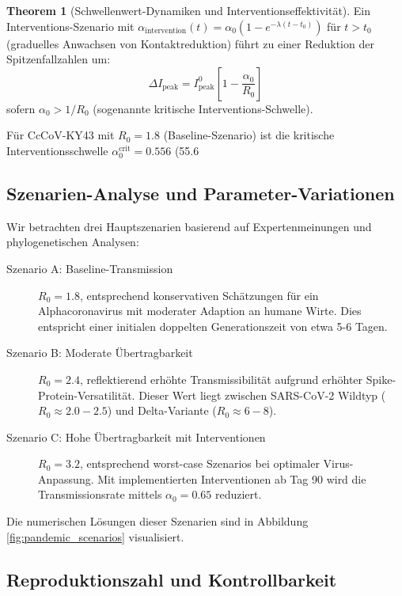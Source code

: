 \documentclass[11pt,a4paper]{article}
\theoremstyle{definition}
\newtheorem{theorem}{Theorem}[section]
\begin{document}
\begin{theorem}[Schwellenwert-Dynamiken und Interventionseffektivität]
\label{thm:intervention_threshold}
Ein Interventions-Szenario mit $\alpha_{\text{intervention}}(t) = \alpha_0 (1 - e^{-\lambda(t - t_0)})$ für $t > t_0$ (graduelles Anwachsen von Kontaktreduktion) führt zu einer Reduktion der Spitzenfallzahlen um:
\[
\Delta I_{\text{peak}} = I_{\text{peak}}^{0} \left[1 - \frac{\alpha_0}{R_0}\right]
\]
sofern $\alpha_0 > 1/R_0$ (sogenannte kritische Interventions-Schwelle).

Für CcCoV-KY43 mit $R_0 = 1.8$ (Baseline-Szenario) ist die kritische Interventionsschwelle $\alpha_0^{\text{crit}} = 0.556$ (55.6%
\end{theorem}

\subsection{Szenarien-Analyse und Parameter-Variationen}

Wir betrachten drei Hauptszenarien basierend auf Expertenmeinungen und phylogenetischen Analysen:

\begin{description}
\item[Szenario A: Baseline-Transmission] $R_0 = 1.8$, entsprechend konservativen Schätzungen für ein Alphacoronavirus mit moderater Adaption an humane Wirte. Dies entspricht einer initialen doppelten Generationszeit von etwa 5-6 Tagen.

\item[Szenario B: Moderate Übertragbarkeit] $R_0 = 2.4$, reflektierend erhöhte Transmissibilität aufgrund erhöhter Spike-Protein-Versatilität. Dieser Wert liegt zwischen SARS-CoV-2 Wildtyp ($R_0 \approx 2.0-2.5$) und Delta-Variante ($R_0 \approx 6-8$).

\item[Szenario C: Hohe Übertragbarkeit mit Interventionen] $R_0 = 3.2$, entsprechend worst-case Szenarios bei optimaler Virus-Anpassung. Mit implementierten Interventionen ab Tag 90 wird die Transmissionsrate mittels $\alpha_0 = 0.65$ reduziert.
\end{description}

Die numerischen Lösungen dieser Szenarien sind in Abbildung \ref{fig:pandemic_scenarios} visualisiert.

\subsection{Reproduktionszahl und Kontrollbarkeit}
\end{document}
